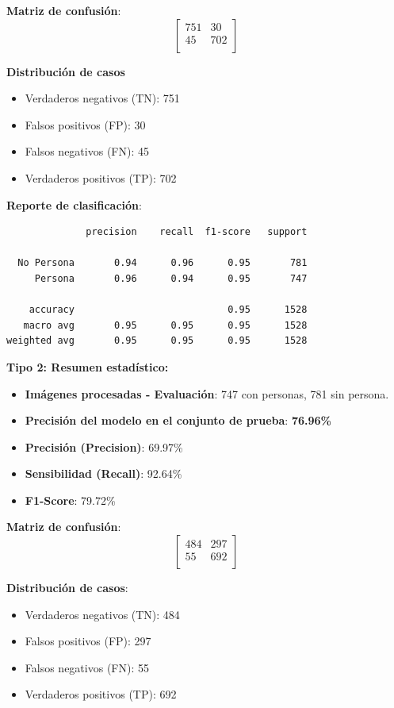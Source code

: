 \documentclass[a4paper]{article}
\begin{document}
\textbf{Matriz de confusión}:
\[
\begin{bmatrix}
751 & 30 \\
45 & 702 \\
\end{bmatrix}
\]

\textbf{Distribución de casos}
\begin{itemize}
    \item Verdaderos negativos (TN): 751
    \item Falsos positivos (FP): 30
    \item Falsos negativos (FN): 45
    \item Verdaderos positivos (TP): 702
\end{itemize}

\textbf{Reporte de clasificación}:

\begin{verbatim}
              precision    recall  f1-score   support

  No Persona       0.94      0.96      0.95       781
     Persona       0.96      0.94      0.95       747

    accuracy                           0.95      1528
   macro avg       0.95      0.95      0.95      1528
weighted avg       0.95      0.95      0.95      1528
\end{verbatim}

\textbf{Tipo 2: Resumen estadístico:}
\begin{itemize}
    \item \textbf{Imágenes procesadas - Evaluación}: 747 con personas, 781 sin persona.
    \item \textbf{Precisión del modelo en el conjunto de prueba}: \textbf{76.96\%}
    \item \textbf{Precisión (Precision)}: 69.97\%
    \item \textbf{Sensibilidad (Recall)}: 92.64\%
    \item \textbf{F1-Score}: 79.72\%
\end{itemize}

\textbf{Matriz de confusión}:
\[
\begin{bmatrix}
484 & 297 \\
55 & 692 \\
\end{bmatrix}
\]

\textbf{Distribución de casos}:
\begin{itemize}
    \item Verdaderos negativos (TN): 484
    \item Falsos positivos (FP): 297
    \item Falsos negativos (FN): 55
    \item Verdaderos positivos (TP): 692
\end{itemize}
\end{document}
